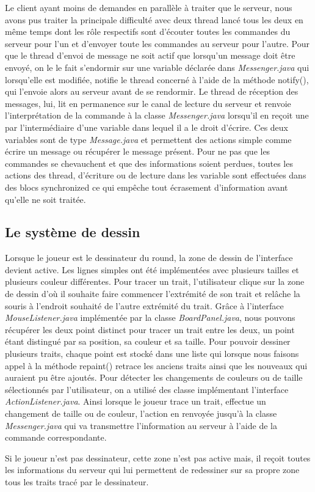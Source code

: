 \documentclass[a4paper, 11pt]{article}
\begin{document}
Le client ayant moins de demandes en parallèle à traiter que le serveur,
nous avons pus traiter la principale difficulté avec deux thread
lancé tous les deux en même temps dont les rôle respectifs sont d'écouter
toutes les commandes du serveur pour l'un et d'envoyer toute les commandes
au serveur pour l'autre.
Pour que le thread d'envoi de message ne soit actif que lorsqu'un message
doit être envoyé, on le le fait s'endormir sur une variable déclarée dans
\textit{Messenger.java} qui lorsqu'elle est modifiée, notifie le thread concerné à
l'aide de la méthode notify(), qui l'envoie alors au serveur avant de se
rendormir.
Le thread de réception des messages, lui, lit en permanence sur le canal
de lecture du serveur et renvoie l'interprétation de la commande à la
classe \textit{Messenger.java} lorsqu'il en reçoit une par l'intermédiaire d'une
variable dans lequel il a le droit d'écrire.
Ces deux variables sont de type \textit{Message.java} et permettent des actions
simple comme écrire un message ou récupérer le message présent.
Pour ne pas que les commandes se chevauchent et que des informations soient
perdues, toutes les actions des thread, d'écriture ou de lecture dans
les variable sont effectuées dans des blocs synchronized ce qui empêche
tout écrasement d'information avant qu'elle ne soit traitée.

\subsection{Le système de dessin}

Lorsque le joueur est le dessinateur du round, la zone de dessin de
l'interface devient active. Les lignes simples ont été implémentées avec
plusieurs tailles et plusieurs couleur différentes. Pour tracer un trait,
l'utilisateur clique sur la zone de dessin d'où il souhaite faire commencer
l’extrémité de son trait et relâche la souris à l'endroit souhaité de l'autre
extrémité du trait.
Grâce à l'interface \textit{MouseListener.java} implémentée par la classe \textit{BoardPanel.java},
nous pouvons récupérer les deux point distinct pour tracer un trait entre
les deux, un point étant distingué par sa position, sa  couleur et sa taille.
Pour pouvoir dessiner plusieurs traits, chaque point est stocké dans une liste
qui lorsque nous faisons appel à la méthode repaint() retrace les anciens traits
ainsi que les nouveaux qui auraient pu être ajoutés.
Pour détecter les changements de couleurs ou de taille sélectionnés par l'utilisateur,
on a utilisé des classe implémentant l'interface \textit{ActionListener.java}.
Ainsi lorsque le joueur trace un trait, effectue un changement de taille
ou de couleur, l'action en renvoyée jusqu'à la classe \textit{Messenger.java} qui va
transmettre l'information au serveur à l'aide de la commande correspondante.

Si le joueur n'est pas dessinateur, cette zone n'est pas active mais, il reçoit toutes les informations du serveur qui lui permettent de redessiner sur sa propre zone tous les traits tracé par le dessinateur.
\end{document}
